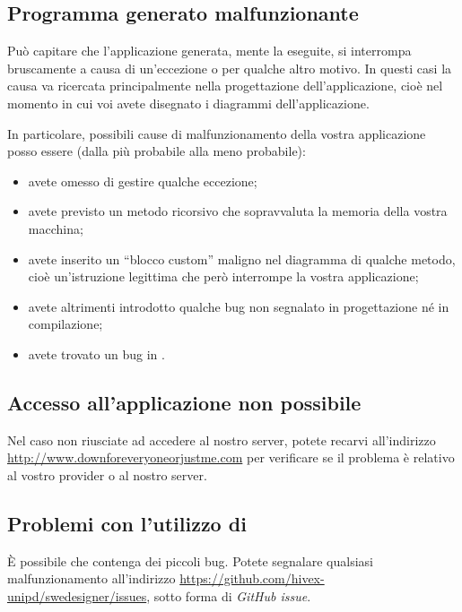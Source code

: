 \subsection{Programma generato malfunzionante} \label{sec:mal_gen}

Può capitare che l'applicazione generata, mente la eseguite, si interrompa bruscamente a causa di un'eccezione o per qualche altro motivo. In questi casi la causa va ricercata principalmente nella progettazione dell'applicazione, cioè nel momento in cui voi avete disegnato i diagrammi dell'applicazione.

In particolare, possibili cause di malfunzionamento della vostra applicazione posso essere (dalla più probabile alla meno probabile):
\begin{itemize}
	\item avete omesso di gestire qualche eccezione;
	\item avete previsto un metodo ricorsivo che sopravvaluta la memoria della vostra macchina;
	\item avete inserito un “blocco custom” maligno nel diagramma di qualche metodo, cioè un'istruzione legittima che però interrompe la vostra applicazione;
	\item avete altrimenti introdotto qualche bug non segnalato in progettazione né in compilazione;
	\item avete trovato un bug in \proj.
\end{itemize}



\subsection{Accesso all'applicazione non possibile}

Nel caso non riusciate ad accedere al nostro server, potete recarvi all'indirizzo \url{http://www.downforeveryoneorjustme.com} per verificare se il problema è relativo al vostro provider o al nostro server.



\subsection{Problemi con l'utilizzo di \proj}

È possibile che \proj{} contenga dei piccoli bug. Potete segnalare qualsiasi malfunzionamento all'indirizzo \url{https://github.com/hivex-unipd/swedesigner/issues}, sotto forma di \emph{GitHub issue}.






